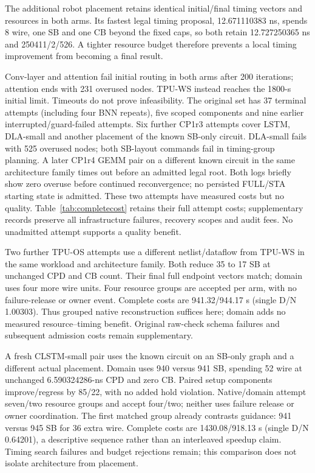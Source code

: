 \documentclass[conference,10pt]{IEEEtran}
\begin{document}
The additional robot placement retains identical initial/final timing vectors and resources in both arms. Its fastest legal timing proposal, 12.671110383 ns, spends 8 wire, one SB and one CB beyond the fixed caps, so both retain 12.727250365 ns and 250411/2/526. A tighter resource budget therefore prevents a local timing improvement from becoming a final result.

Conv-layer and attention fail initial routing in both arms after 200 iterations; attention ends with 231 overused nodes. TPU-WS instead reaches the 1800-s initial limit. Timeouts do not prove infeasibility. The original set has 37 terminal attempts (including four BNN repeats), five scoped components and nine earlier interrupted/guard-failed attempts. Six further CP1r3 attempts cover LSTM, DLA-small and another placement of the known SB-only circuit. DLA-small fails with 525 overused nodes; both SB-layout commands fail in timing-group planning. A later CP1r4 GEMM pair on a different known circuit in the same architecture family times out before an admitted legal root. Both logs briefly show zero overuse before continued reconvergence; no persisted FULL/STA starting state is admitted. These two attempts have measured costs but no quality. Table~\ref{tab:completecost} retains their full attempt costs; supplementary records preserve all infrastructure failures, recovery scopes and audit fees. No unadmitted attempt supports a quality benefit.

Two further TPU-OS attempts use a different netlist/dataflow from TPU-WS in the same workload and architecture family. Both reduce 35 to 17 SB at unchanged CPD and CB count. Their final full endpoint vectors match; domain uses four more wire units. Four resource groups are accepted per arm, with no failure-release or owner event. Complete costs are 941.32/944.17 s (single D/N 1.00303). Thus grouped native reconstruction suffices here; domain adds no measured resource--timing benefit. Original raw-check schema failures and subsequent admission costs remain supplementary.

A fresh CLSTM-small pair uses the known circuit on an SB-only graph and a different actual placement. Domain uses 940 versus 941 SB, spending 52 wire at unchanged 6.590324286-ns CPD and zero CB. Paired setup components improve/regress by 85/22, with no added hold violation. Native/domain attempt seven/two resource groups and accept four/two; neither uses failure release or owner coordination. The first matched group already contrasts guidance: 941 versus 945 SB for 36 extra wire. Complete costs are 1430.08/918.13 s (single D/N 0.64201), a descriptive sequence rather than an interleaved speedup claim. Timing search failures and budget rejections remain; this comparison does not isolate architecture from placement.
\end{document}
